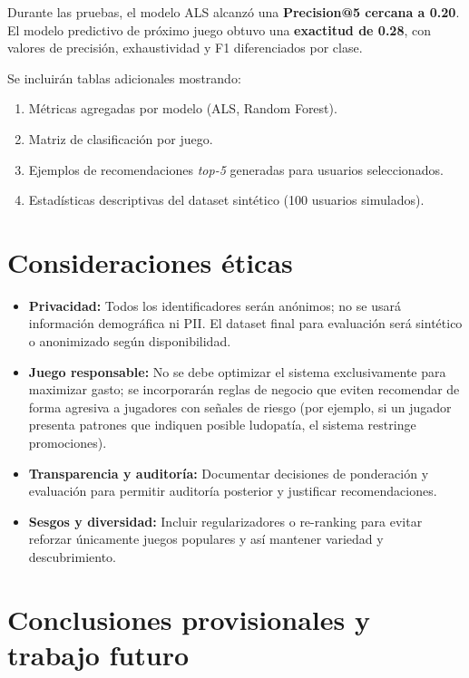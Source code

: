 \documentclass[12pt,a4paper]{article}
\begin{document}
Durante las pruebas, el modelo ALS alcanzó una \textbf{Precision@5 cercana a 0.20}.
El modelo predictivo de próximo juego obtuvo una \textbf{exactitud de 0.28}, con valores
de precisión, exhaustividad y F1 diferenciados por clase.

Se incluirán tablas adicionales mostrando:

\begin{enumerate}
    \item Métricas agregadas por modelo (ALS, Random Forest).
    \item Matriz de clasificación por juego.
    \item Ejemplos de recomendaciones \textit{top-5} generadas para usuarios seleccionados.
    \item Estadísticas descriptivas del dataset sintético (100 usuarios simulados).
\end{enumerate}

\section{Consideraciones éticas}
\begin{itemize}[leftmargin=*]
    \item \textbf{Privacidad:} Todos los identificadores serán anónimos; no se usará información demográfica ni PII. El dataset final para evaluación será sintético o anonimizado según disponibilidad.
    \item \textbf{Juego responsable:} No se debe optimizar el sistema exclusivamente para maximizar gasto; se incorporarán reglas de negocio que eviten recomendar de forma agresiva a jugadores con señales de riesgo (por ejemplo, si un jugador presenta patrones que indiquen posible ludopatía, el sistema restringe promociones).
    \item \textbf{Transparencia y auditoría:} Documentar decisiones de ponderación y evaluación para permitir auditoría posterior y justificar recomendaciones.
    \item \textbf{Sesgos y diversidad:} Incluir regularizadores o re-ranking para evitar reforzar únicamente juegos populares y así mantener variedad y descubrimiento.
\end{itemize}

\section{Conclusiones provisionales y trabajo futuro}
\end{document}
